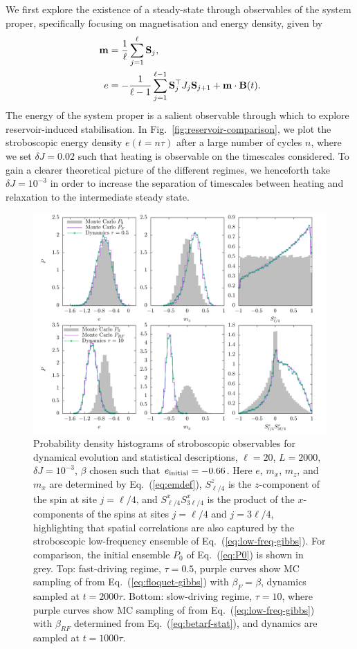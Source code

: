 \documentclass[prl,aps,twocolumn,notitlepage,10pt]{revtex4-1}
\newcommand{\beA}{\begin{equation}\begin{aligned}}
\newcommand{\eeA}{\end{aligned}\end{equation}}
\begin{document}
We first explore the existence of a steady-state through observables of the
system proper, specifically focusing on magnetisation and energy density, given
by
\beA
{\bf m} &= \frac{1}{\ell} \sum_{j=1}^\ell {\bf S}_j ,\\
e &= - \frac{1}{\ell-1} \sum_{j=1}^{\ell-1} {\bf S}_j^\top J_j {\bf S}_{j+1} +  {\bf m} \cdot {\bf B}(t) . \label{eq:emdef}
\eeA
The energy of the system proper is a salient observable through which to
explore reservoir-induced stabilisation.
In Fig.~\ref{fig:reservoir-comparison}, we plot the stroboscopic energy density
$e(t=n\tau)$ after a large number of cycles $n$, where we set $\delta J = 0.02$
such that heating is observable on the timescales considered.
To gain a clearer theoretical picture of the different regimes, we henceforth
take $\delta J = 10^{-3}$ in order to increase the separation of timescales
between heating and relaxation to the intermediate steady state.
\begin{figure}[ht!]
  \includegraphics[width=\linewidth]{figs/fig-2-histogram-array.pdf}
  \caption{
  Probability density histograms of stroboscopic
  observables for dynamical evolution and statistical
  descriptions, $\ell=20$,
  $L=2000$, $\delta J = 10^{-3}$, $\beta$ chosen such
  that $e_{\rm initial}=-0.66$.
  Here $e$, $m_x$, $m_z$, and $m_x$ are determined by
  Eq.~(\ref{eq:emdef}), $S^z_{\ell/4}$ is the $z$-component of the
  spin at site $j=\ell/4$, and $S^x_{\ell/4} S^x_{3\ell/4}$ is
  the product of the $x$-components of the spins at sites $j=\ell/4$ and
  $j=3\ell/4$, highlighting that spatial correlations are also captured by the
  stroboscopic low-frequency ensemble of Eq.~(\ref{eq:low-freq-gibbs}).
  For comparison, the initial ensemble $P_0$ of Eq.~(\ref{eq:P0}) is
  shown in grey.
  Top: fast-driving regime, $\tau=0.5$, purple curves show MC sampling of from
  Eq.~(\ref{eq:floquet-gibbs}) with $\beta_{F} = \beta$, dynamics sampled at
  $t=2000\tau$.
  Bottom: slow-driving regime, $\tau=10$, where purple curves show MC
  sampling of from Eq.~(\ref{eq:low-freq-gibbs}) with $\beta_{RF}$ determined
  from Eq.~(\ref{eq:betarf-stat}), and dynamics are sampled at $t=1000\tau$.
  }
  \label{fig:histogram-array}
\end{figure}
\end{document}
